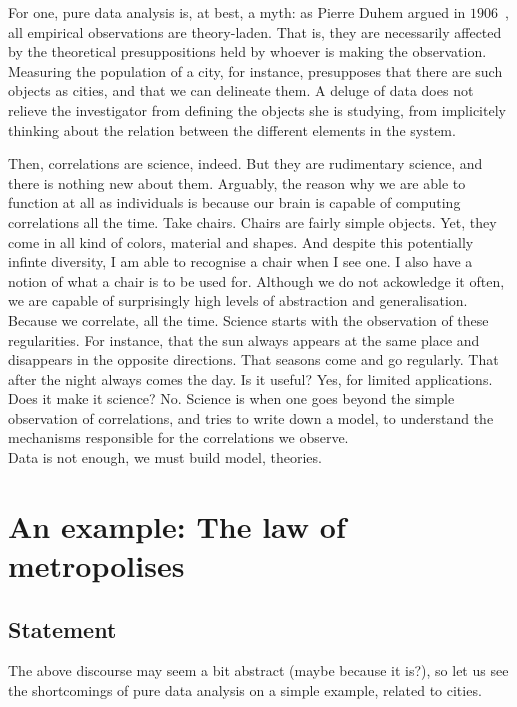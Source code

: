 For one, pure data analysis is, at best, a myth: as Pierre Duhem argued in
$1906$~\cite{Duhem:1997}, all empirical observations are theory-laden. That is,
they are necessarily affected by the theoretical presuppositions held by whoever
is making the observation. Measuring the population of a city, for instance,
presupposes that there are such objects as cities, and that we can delineate
them. A deluge of data does not relieve the investigator from defining the
objects she is studying, from implicitely thinking about the relation between
the different elements in the system.

Then, correlations are science, indeed. But they are rudimentary science, and
there is nothing new about them. Arguably, the reason why we are able to
function at all as individuals is because our brain is capable of computing
correlations all the time. Take chairs. Chairs are fairly simple objects. Yet,
they come in all kind of colors, material and shapes. And despite this
potentially infinte diversity, I am able to recognise a chair when I see one. I
also have a notion of what a chair is to be used for. Although we do not
ackowledge it often, we are capable of surprisingly high levels of abstraction
and generalisation. Because we correlate, all the time. Science starts with the
observation of these regularities. For instance, that the sun always appears at
the same place and disappears in the opposite directions. That seasons come and
go regularly. That after the night always comes the day. Is it useful? Yes, for
limited applications. Does it make it science? No. Science is when one goes
beyond the simple observation of correlations, and tries to write down a model,
to understand the mechanisms responsible for the correlations we observe.\\

Data is not enough, we must build model, theories.

\section{An example: The law of metropolises}
\label{sec:an_example_the_law_of_metropolises}

\subsection{Statement}
\label{sub:statement}

The above discourse may seem a bit abstract (maybe because it is?), so let us
see the shortcomings of pure data analysis on a simple example, related to
cities.

